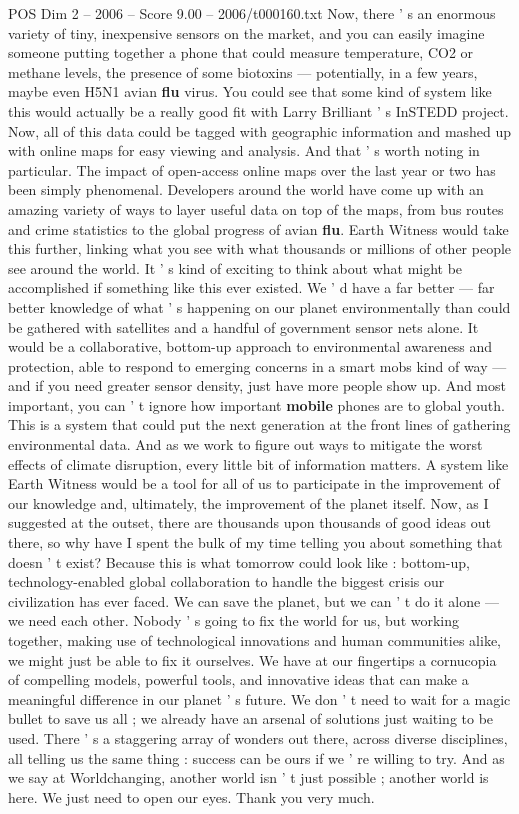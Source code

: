 \begin{textsample}{POS Dim 2 – 2006 – Score 9.00 – 2006/t000160.txt}
Now, there ' s an enormous variety of tiny, inexpensive sensors on the market, and you can easily imagine someone putting together a phone that could measure temperature, CO2 or methane levels, the presence of some biotoxins — potentially, in a few years, maybe even H5N1 avian \textbf{flu} virus.
You could see that some kind of system like this would actually be a really good fit with Larry Brilliant ' s InSTEDD project.
Now, all of this data could be tagged with geographic information and mashed up with online maps for easy viewing and analysis.
And that ' s worth noting in particular.
The impact of open-access online maps over the last year or two has been simply phenomenal.
Developers around the world have come up with an amazing variety of ways to layer useful data on top of the maps, from bus routes and crime statistics to the global progress of avian \textbf{flu}.
Earth Witness would take this further, linking what you see with what thousands or millions of other people see around the world.
It ' s kind of exciting to think about what might be accomplished if something like this ever existed.
We ' d have a far better — far better knowledge of what ' s happening on our planet environmentally than could be gathered with satellites and a handful of government sensor nets alone.
It would be a collaborative, bottom-up approach to environmental awareness and protection, able to respond to emerging concerns in a smart mobs kind of way — and if you need greater sensor density, just have more people show up.
And most important, you can ' t ignore how important \textbf{mobile} phones are to global youth.
This is a system that could put the next generation at the front lines of gathering environmental data.
And as we work to figure out ways to mitigate the worst effects of climate disruption, every little bit of information matters.
A system like Earth Witness would be a tool for all of us to participate in the improvement of our knowledge and, ultimately, the improvement of the planet itself.
Now, as I suggested at the outset, there are thousands upon thousands of good ideas out there, so why have I spent the bulk of my time telling you about something that doesn ' t exist?
Because this is what tomorrow could look like : bottom-up, technology-enabled global collaboration to handle the biggest crisis our civilization has ever faced.
We can save the planet, but we can ' t do it alone — we need each other.
Nobody ' s going to fix the world for us, but working together, making use of technological innovations and human communities alike, we might just be able to fix it ourselves.
We have at our fingertips a cornucopia of compelling models, powerful tools, and innovative ideas that can make a meaningful difference in our planet ' s future.
We don ' t need to wait for a magic bullet to save us all ; we already have an arsenal of solutions just waiting to be used.
There ' s a staggering array of wonders out there, across diverse disciplines, all telling us the same thing : success can be ours if we ' re willing to try.
And as we say at Worldchanging, another world isn ' t just possible ; another world is here.
We just need to open our eyes.
Thank you very much.

\end{textsample}
